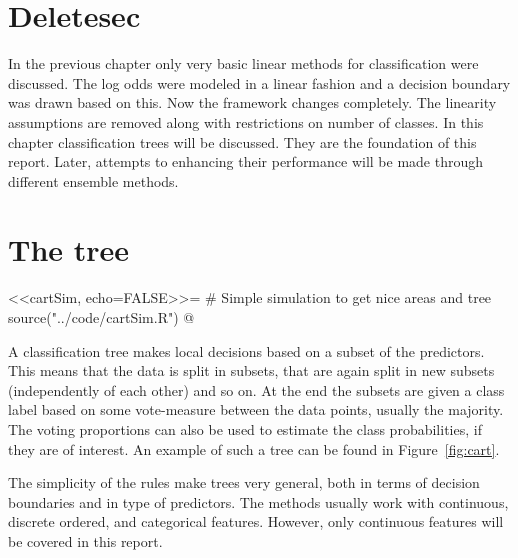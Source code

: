 \section{Deletesec}
In the previous chapter only very basic linear methods for classification were discussed. The log odds were modeled in a linear fashion and a decision boundary was drawn based on this. Now the framework changes completely. The linearity assumptions are removed along with restrictions on number of classes. 
In this chapter classification trees will be discussed. They are the foundation of this report. Later, attempts to enhancing their performance will be made through different ensemble methods. 

\section{The tree}
\label{sec:Tree}
<<cartSim, echo=FALSE>>=
# Simple simulation to get nice areas and tree
source("../code/cartSim.R")
@

A classification tree makes local decisions based on a subset of the predictors. This means that the data is split in subsets, that are again split in new subsets (independently of each other) and so on. 
At the end the subsets are given a class label based on some vote-measure between the data points, usually the majority.
The voting proportions can also be used to estimate the class probabilities, if they are of interest.
An example of such a tree can be found in Figure~\ref{fig:cart}.

The simplicity of the rules make trees very general, both in terms of decision boundaries and in type of predictors. The methods usually work with continuous, discrete ordered, and categorical features. However, only continuous features will be covered in this report.  

